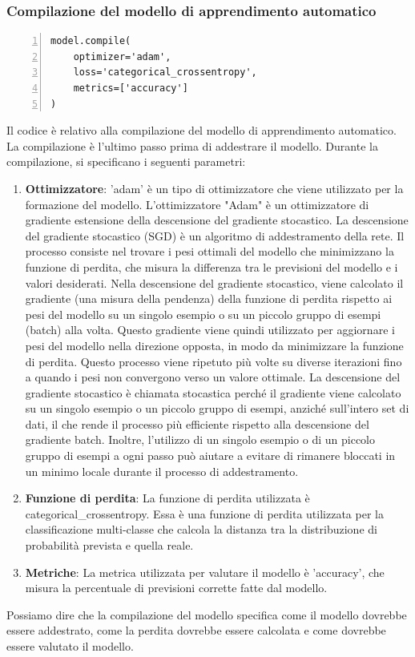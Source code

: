 \documentclass[a4paper,final,12pt]{report}
\begin{document}
\subsubsection{Compilazione del modello di apprendimento automatico}
\begin{lstlisting}[caption={Compilazione del modello di apprendimento automatico.}, label={lst:compilazione_modello}, breaklines, escapechar=`\%, frame=lines, basicstyle=\small\ttfamily, keepspaces=true, numbers=left]
model.compile(
    optimizer='adam',
    loss='categorical_crossentropy',
    metrics=['accuracy']
)
\end{lstlisting}
Il codice è relativo alla compilazione del modello di apprendimento automatico. La compilazione è l'ultimo passo prima di addestrare il modello. Durante la compilazione, si specificano i seguenti parametri:
\begin{enumerate}
    \item \textbf{Ottimizzatore}: 'adam' è un tipo di ottimizzatore che viene utilizzato per la formazione del modello. L'ottimizzatore "Adam" è un ottimizzatore di gradiente estensione della descensione del gradiente stocastico. La descensione del gradiente stocastico (SGD) è un algoritmo di addestramento della rete. Il processo consiste nel trovare i pesi ottimali del modello che minimizzano la funzione di perdita, che misura la differenza tra le previsioni del modello e i valori desiderati. Nella descensione del gradiente stocastico, viene calcolato il gradiente (una misura della pendenza) della funzione di perdita rispetto ai pesi del modello su un singolo esempio o su un piccolo gruppo di esempi (batch) alla volta. Questo gradiente viene quindi utilizzato per aggiornare i pesi del modello nella direzione opposta, in modo da minimizzare la funzione di perdita. Questo processo viene ripetuto più volte su diverse iterazioni fino a quando i pesi non convergono verso un valore ottimale. La descensione del gradiente stocastico è chiamata stocastica perché il gradiente viene calcolato su un singolo esempio o un piccolo gruppo di esempi, anziché sull'intero set di dati, il che rende il processo più efficiente rispetto alla descensione del gradiente batch. Inoltre, l'utilizzo di un singolo esempio o di un piccolo gruppo di esempi a ogni passo può aiutare a evitare di rimanere bloccati in un minimo locale durante il processo di addestramento.
    \item \textbf{Funzione di perdita}: La funzione di perdita utilizzata è categorical\_crossentropy. Essa è una funzione di perdita utilizzata per la classificazione multi-classe che calcola la distanza tra la distribuzione di probabilità prevista e quella reale.
    \item \textbf{Metriche}: La metrica utilizzata per valutare il modello è 'accuracy', che misura la percentuale di previsioni corrette fatte dal modello.
\end{enumerate}
Possiamo dire che la compilazione del modello specifica come il modello dovrebbe essere addestrato, come la perdita dovrebbe essere calcolata e come dovrebbe essere valutato il modello.\\
\end{document}
